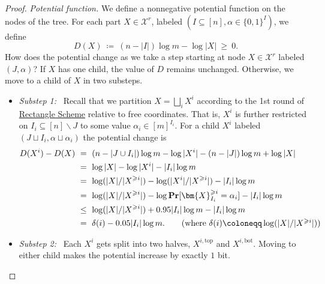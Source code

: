 \documentclass[11pt]{article}
\numberwithin{equation}{section}
\theoremstyle{definition}
\theoremstyle{plain}
\newcommand{\rectscheme}{\hyperref[alg:partition]{Rectangle Scheme}\xspace}
\renewcommand{\Pr}{\mathbf{Pr}}
\newcommand{\X}{\bm{X}}
\newcommand{\calX}{\mathcal{X}}
\newcommand{\topp}{\text{top}}
\newcommand{\bott}{\text{bot}}
\begin{document}
\begin{proof}
\emph{Potential function.}
We define a nonnegative potential function on the nodes of the tree. For each part $X\in\calX^r$, labeled $(I\subseteq[n],\alpha\in\{0,1\}^I)$, we define
\[
D(X)~\coloneqq~(n-|I|)\log m - \log|X|~\geq~0.
\]
How does the potential change as we take a step starting at node $X\in\calX^r$ labeled $(J,\alpha)$? If $X$ has one child, the value of $D$ remains unchanged. Otherwise, we move to a child of $X$ in two substeps.
	\begin{itemize}[itemsep=1mm]
		\item \emph{Substep 1:}~ Recall that we partition $X =\bigsqcup_i X^i$ according to the 1st round of \rectscheme relative to free coordinates. That is, $X^i$ is further restricted on $I_i\subseteq[n]\smallsetminus J$ to some value $\alpha_i\in[m]^{I_i}$. For a child $X^i$ labeled $(J\sqcup I_i,\alpha\sqcup\alpha_i)$ the potential change is
		\begin{align*}
		D(X^i)-D(X)~
		&=~(n-|J\cup I_i|)\log m - \log|X^i| - (n-|J|)\log m + \log|X|\\
		&=~\log|X| - \log |X^i| - |I_i|\log m\\
		&=~\log(|X|/|X^{\geqslant i}|) - \log(|X^i|/|X^{\geqslant i}|) - |I_i|\log m\\
		&=~\log(|X|/|X^{\geqslant i}|) - \log\Pr[\X^{\geqslant i}_{I_i} = \alpha_i] - |I_i|\log m\\
		&\leq~\log(|X|/|X^{\geqslant i}|) + 0.95|I_i|\log m - |I_i|\log m\\
		&=~\delta(i) - 0.05|I_i|\log m.\tag{where $\delta(i)\coloneqq\log(|X|/|X^{\geqslant i}|)$}
		\end{align*}
		
		\item \emph{Substep 2:}~ Each $X^i$ gets split into two halves, $X^{i,\topp}$ and $X^{i,\bott}$. Moving to either child makes the potential increase by exactly $1$ bit.
\end{itemize}
	

\end{proof}
\end{document}
